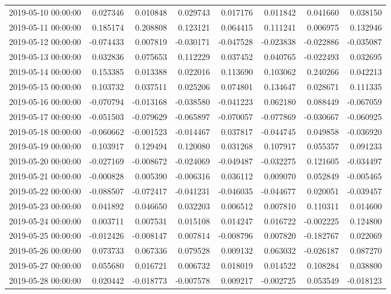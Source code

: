 \begin{tabular}{lrrrrrrr}
2019-05-10 00:00:00 & 0.027346 & 0.010848 & 0.029743 & 0.017176 & 0.011842 & 0.041660 & 0.038150 \\
2019-05-11 00:00:00 & 0.185174 & 0.208808 & 0.123121 & 0.064415 & 0.111241 & 0.006975 & 0.132946 \\
2019-05-12 00:00:00 & -0.074433 & 0.007819 & -0.030171 & -0.047528 & -0.023838 & -0.022886 & -0.035087 \\
2019-05-13 00:00:00 & 0.032836 & 0.075653 & 0.112229 & 0.037452 & 0.040765 & -0.022493 & 0.032695 \\
2019-05-14 00:00:00 & 0.153385 & 0.013388 & 0.022016 & 0.113690 & 0.103062 & 0.240266 & 0.042213 \\
2019-05-15 00:00:00 & 0.103732 & 0.037511 & 0.025206 & 0.074801 & 0.134647 & 0.028671 & 0.111335 \\
2019-05-16 00:00:00 & -0.070794 & -0.013168 & -0.038580 & -0.041223 & 0.062180 & 0.088449 & -0.067059 \\
2019-05-17 00:00:00 & -0.051503 & -0.079629 & -0.065897 & -0.070057 & -0.077869 & -0.030667 & -0.060925 \\
2019-05-18 00:00:00 & -0.060662 & -0.001523 & -0.014467 & 0.037817 & -0.044745 & 0.049858 & -0.036920 \\
2019-05-19 00:00:00 & 0.103917 & 0.129494 & 0.120080 & 0.031268 & 0.107917 & 0.055357 & 0.091233 \\
2019-05-20 00:00:00 & -0.027169 & -0.008672 & -0.024069 & -0.049487 & -0.032275 & 0.121605 & -0.034497 \\
2019-05-21 00:00:00 & -0.000828 & 0.005390 & -0.006316 & 0.036112 & 0.009070 & 0.052849 & -0.005465 \\
2019-05-22 00:00:00 & -0.088507 & -0.072417 & -0.041231 & -0.046035 & -0.044677 & 0.020051 & -0.039457 \\
2019-05-23 00:00:00 & 0.041892 & 0.046650 & 0.032203 & 0.006512 & 0.007810 & 0.110311 & 0.014600 \\
2019-05-24 00:00:00 & 0.003711 & 0.007531 & 0.015108 & 0.014247 & 0.016722 & -0.002225 & 0.124800 \\
2019-05-25 00:00:00 & -0.012426 & -0.008147 & 0.007814 & -0.008796 & 0.007820 & -0.182767 & 0.022069 \\
2019-05-26 00:00:00 & 0.073733 & 0.067336 & 0.079528 & 0.009132 & 0.063032 & -0.026187 & 0.087270 \\
2019-05-27 00:00:00 & 0.055680 & 0.016721 & 0.006732 & 0.018019 & 0.014522 & 0.108284 & 0.038800 \\
2019-05-28 00:00:00 & 0.020442 & -0.018773 & -0.007578 & 0.009217 & -0.002725 & 0.053549 & -0.018123 \\

\end{tabular}
